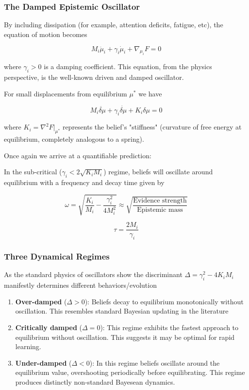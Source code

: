 \documentclass[12pt]{article}
\begin{document}
\subsubsection{The Damped Epistemic Oscillator}

By including dissipation (for example, attention deficits, fatigue, etc), the equation of motion becomes

\begin{equation}
M_i\ddot{\mu}_i + \gamma_i\dot{\mu}_i + \nabla_{\mu_i}F = 0
\end{equation}

where $\gamma_i > 0$ is a damping coefficient.  This equation, from the physics perspective, is the well-known driven and damped oscillator.

For small displacements from equilibrium $\mu^*$ we have

\begin{equation}
M_i\ddot{\delta\mu} + \gamma_i\dot{\delta\mu} + K_i\delta\mu = 0
\end{equation}

where $K_i = \nabla^2 F|_{\mu^*}$ represents the belief's "stiffness" (curvature of free energy at equilibrium, completely analogous to a spring).

Once again we arrive at a quantifiable prediction:

In the sub-critical ($\gamma_i < 2\sqrt{K_i M_i}$) regime, beliefs will oscillate around equilibrium with a frequency and decay time given by

\begin{equation}
\boxed{\omega = \sqrt{\frac{K_i}{M_i} - \frac{\gamma_i^2}{4M_i^2}} \approx \sqrt{\frac{\text{Evidence strength}}{\text{Epistemic mass}}}}
\end{equation}

\begin{equation}
\tau = \frac{2M_i}{\gamma_i}
\end{equation}


\subsubsection{Three Dynamical Regimes}

As the standard physics of oscillators show the discriminant $\Delta = \gamma_i^2 - 4K_iM_i$ manifestly determines different behaviors/evolution

\begin{enumerate}
\item \textbf{Over-damped} ($\Delta > 0$): Beliefs decay to equilibrium monotonically without oscillation. This resembles standard Bayesian updating in the literature

\item \textbf{Critically damped} ($\Delta = 0$): This regime exhibits the fastest approach to equilibrium without oscillation. This suggests it may be optimal for rapid learning.

\item \textbf{Under-damped} ($\Delta < 0$): In this regime beliefs oscillate around the equilibrium value, overshooting periodically before equilibrating. This regime produces distinctly non-standard Bayesean dynamics.
\end{enumerate}
\end{document}
